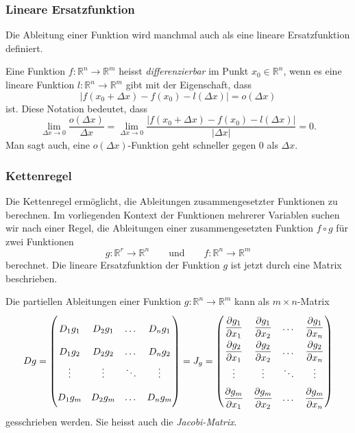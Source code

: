 %
%
\subsubsection{Lineare Ersatzfunktion}

Die Ableitung einer Funktion wird manchmal auch als eine lineare
Ersatzfunktion definiert.

\begin{definition}
Eine Funktion $f\colon\mathbb{R}^n\to\mathbb{R}^m$ heisst {\em differenzierbar}
im Punkt $x_0\in\mathbb{R}^n$, wenn es eine lineare Funktion
$l\colon \mathbb{R}^n\to\mathbb{R}^m$ gibt mit der Eigenschaft, dass
\[
|f(x_0+\Delta x) - f(x_0) - l(\Delta x)| = o(\Delta x)
\]
ist.
Diese Notation bedeutet, dass
\[
\lim_{\Delta x\to 0}
\frac{o(\Delta x)}{\Delta x}
=
\lim_{\Delta x\to 0}
\frac{|f(x_0+\Delta x)-f(x_0)-l(\Delta x)|}{|\Delta x|}
=
0.
\]
Man sagt auch, eine $o(\Delta x)$-Funktion geht schneller gegen $0$ als
$\Delta x$.
\end{definition}

%
%
\subsubsection{Kettenregel}
Die Kettenregel ermöglicht, die Ableitungen zusammengesetzter Funktionen
zu berechnen.
Im vorliegenden Kontext der Funktionen mehrerer Variablen suchen
wir nach einer Regel, die Ableitungen einer zusammengesetzten Funktion
$f\circ g$
für zwei Funktionen
\[
g\colon \mathbb{R}^r\to\mathbb{R}^n
\qquad\text{und}\qquad
f\colon \mathbb{R}^n\to\mathbb{R}^m
\]
berechnet.
Die lineare Ersatzfunktion der Funktion $g$ ist jetzt durch
eine Matrix beschrieben.

\begin{definition}
\label{buch:fuvar:richtungsableitung:def:ableitungsmatrix}
Die partiellen Ableitungen einer Funktion
$g\colon\mathbb{R}^n\to\mathbb{R}^m$
kann als $m\times n$-Matrix
\[
Dg
=
\begin{pmatrix}
D_1g_1 & D_2g_1 & \dots  & D_ng_1 \\
D_1g_2 & D_2g_2 & \dots  & D_ng_2 \\
\vdots & \vdots & \ddots & \vdots \\
D_1g_m & D_2g_m & \dots  & D_ng_m
\end{pmatrix}
=
J_g
=
{\renewcommand{\arraystretch}{2.0}
\begin{pmatrix}
\displaystyle \frac{\partial g_1}{\partial x_1}
	&\displaystyle \frac{\partial g_1}{\partial x_2}
		&\dots
			&\displaystyle \frac{\partial g_1}{\partial x_n}
\\
\displaystyle \frac{\partial g_2}{\partial x_1}
	&\displaystyle  \frac{\partial g_2}{\partial x_2}
		&\dots
			&\displaystyle \frac{\partial g_2}{\partial x_n}
\\
\vdots	&\vdots	&\ddots	&\vdots \\
\displaystyle \frac{\partial g_m}{\partial x_1}
	&\displaystyle  \frac{\partial g_m}{\partial x_2}
		&\dots
			&\displaystyle \frac{\partial g_m}{\partial x_n}
\end{pmatrix}}
\]
gesschrieben werden.
Sie heisst auch die {\em Jacobi-Matrix}.
%
\end{definition}

